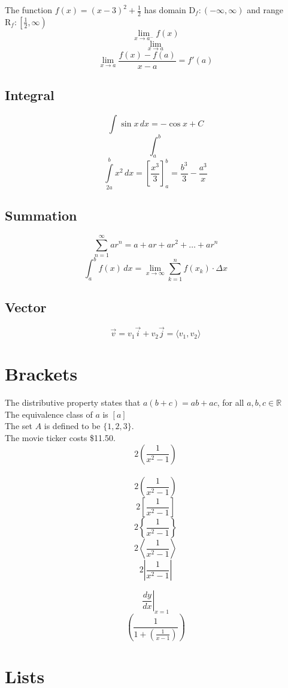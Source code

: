 \documentclass[12pt, a4paper]{article}
\begin{document}
The function $f(x)=(x-3)^2+\frac{1}{2}$ has domain $\mathrm{D}_f:(-\infty,\infty)$
 and range $\mathrm{R}_f:\left[ \frac{1}{2},\infty \right)$\\
 $$\lim \limits_{x \to a^-} f(x)$$
 $$\lim _{x \to a} $$
 $$\lim \limits_{x \to a}\frac{f(x)-f(a)}{x-a}=f'(a)$$

 \subsection{Integral}
 $$\int \sin x \,dx=-\cos x + C$$
 $$\int_a^b$$
 $$\int \limits_{2a}^bx^2 \,dx=\left[ \frac{x^3}{3} \right]_a^b
 =\frac{b^3}{3}-\frac{a^3}{x}$$ 

 \subsection{Summation}
$$\sum \limits_{n=1}^{\infty}ar^n=a+ar+ar^2+\dots+ar^n$$
$$\int_a^b f(x) \,dx=\lim \limits_{x \to \infty} \sum \limits_{k=1}^{n}
f(x_k) \cdot \Delta x $$

\subsection{Vector}
$$\vec{v}=v_1 \vec{i}+v_2 \vec{j} = \langle v_1, v_2 \rangle$$
\section{Brackets}

The distributive property states that $a(b+c)
=ab+ac$, for all $a,b,c\in \mathbb{R}$\\[6pt]
The equivalence class of $a$ is $[a]$\\[6pt]
The set $A$ is defined to be $\{1,2,3\}$.\\[6pt]
The movie ticker costs \$11.50.\\[6pt]  

$$2(\frac{1}{x^2-1})$$ \\
$$2\left(\frac{1}{x^2-1}\right)$$
$$2\left[\frac{1}{x^2-1}\right]$$
$$2\left\{\frac{1}{x^2-1}\right\}$$
$$2\left\langle \frac{1}{x^2-1} \right\rangle$$
$$2\left| \frac{1}{x^2-1} \right|$$

$$\left.\frac{dy}{dx}\right|_{x=1}$$
$$\left( \frac{1}{1+\left(\frac{1}{x-1}\right)} \right)$$

\section{Lists}
\end{document}
